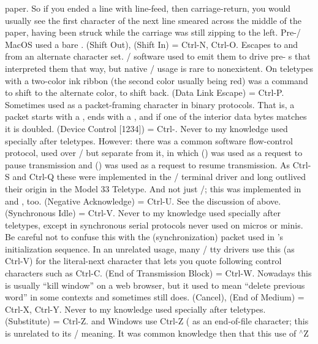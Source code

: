 paper. So if you ended a line with line-feed, then carriage-return, you would
usually see the first character of the next line smeared across the middle of
the paper, having been struck while the carriage was still zipping to the left.
Pre-\UNIX/ MacOS used a bare .
\dlist {} (Shift Out),  (Shift In) = Ctrl-N, Ctrl-O.
Escapes to and from an alternate character set. \UNIX/ software used to emit them
to drive pre- s that interpreted them that way, but native \UNIX/ usage is
rare to nonexistent. On teletypes with a two-color ink ribbon (the second color
usually being red)  was a command to shift to the alternate color,  to
shift back.
\dlist {} (Data Link Escape) = Ctrl-P.
Sometimes used as a packet-framing character in binary protocols. That is, a
packet starts with a , ends with a , and if one of the interior data
bytes matches  it is doubled.
\dlist {} (Device Control [1234]) = Ctrl-\acro{[QRST]}.
Never to my knowledge used specially after teletypes. However: there was a
common software flow-control protocol, used over \ASCII/ but separate from it, in
which  () was used as a request to pause transmission and  () was
used as a request to resume transmission. As Ctrl-S and Ctrl-Q these were
implemented in the \UNIX/ terminal driver and long outlived their origin in the
Model 33 Teletype. And not just \UNIX/; this was implemented in  and ,
too.
\dlist {} (Negative Acknowledge) = Ctrl-U. See the discussion of  above.
\dlist {} (Synchronous Idle) = Ctrl-V.
Never to my knowledge used specially after teletypes, except in synchronous
serial protocols never used on micros or minis. Be careful not to confuse this
with the  (synchronization) packet used in 's  
initialization sequence. In an unrelated usage, many \UNIX/ tty drivers use this
(as Ctrl-V) for the literal-next character that lets you quote following
control characters such as Ctrl-C.
\dlist {} (End of Transmission Block) = Ctrl-W.
Nowadays this is usually ``kill window'' on a web browser, but it used to mean
``delete previous word'' in some contexts and sometimes still does.
\dlist {} (Cancel),  (End of Medium) = Ctrl-X, Ctrl-Y.
Never to my knowledge used specially after teletypes.
\dlist {} (Substitute) = Ctrl-Z.
 and Windows use Ctrl-Z ( as an end-of-file character; this is unrelated
to its \ASCII/ meaning. It was common knowledge then that this use of $^\wedge$Z
